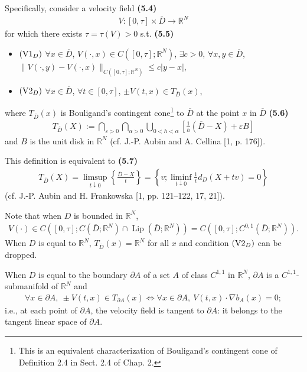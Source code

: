 \documentclass{book}
\numberwithin{equation}{section}
\begin{document}
\begin{enumerate}
    Specifically, consider a velocity field \textbf{(5.4)}
    \begin{align*}
        V:[0,\tau]\times\overline{D}\to\mathbb{R}^N
    \end{align*}
    for which there exists $\tau = \tau(V) > 0$ s.t. \textbf{(5.5)}
    \begin{itemize}
        \item $({\rm V1}_D)$ $\forall x\in\overline{D}$, $V(\cdot,x)\in C([0,\tau];\mathbb{R}^N)$, $\exists c > 0$, $\forall x,y\in\overline{D}$, $\|V(\cdot,y) - V(\cdot,x)\|_{C([0,\tau];\mathbb{R}^N)}\le c|y - x|$,
        \item $({\rm V2}_D)$ $\forall x\in\overline{D}$, $\forall t\in[0,\tau]$, $\pm V(t,x)\in T_{\overline{D}}(x)$,
    \end{itemize}
    where $T_{\overline{D}}(x)$ is Bouligand's contingent cone\footnote{This is an equivalent characterization of Bouligand's contingent cone of Definition 2.4 in Sect. 2.4 of Chap. 2.} to $\overline{D}$ at the point $x$ in $\overline{D}$ \textbf{(5.6)}
    \begin{align*}
        T_{\overline{D}}(X) := \bigcap_{\varepsilon > 0} \bigcap_{\alpha > 0} \bigcup_{0 < h < \alpha} \left[\frac{1}{h}(\overline{D} - X) + \varepsilon B\right]
    \end{align*}
    and $B$ is the unit disk in $\mathbb{R}^N$ (cf. J.-P. Aubin and A. Cellina [1, p. 176]).
    
    This definition is equivalent to \textbf{(5.7)}
    \begin{align*}
        T_{\overline{D}}(X) = \limsup_{t\downarrow 0} \left\{\frac{\overline{D} - X}{t}\right\} = \left\{v;\liminf_{t\downarrow 0} \frac{1}{t}d_D(X + tv) = 0\right\}
    \end{align*}
    (cf. J.-P. Aubin and H. Frankowska [1, pp. 121–122, 17, 21]).
    
    Note that when $D$ is bounded in $\mathbb{R}^N$,
    \begin{align*}
        V(\cdot)\in C([0,\tau];C(\overline{D};\mathbb{R}^N)\cap\operatorname{Lip}(\overline{D};\mathbb{R}^N)) = C([0,\tau];C^{0,1}(\overline{D};\mathbb{R}^N)).
    \end{align*}
    When $D$ is equal to $\mathbb{R}^N$, $T_{\overline{D}}(x) = \mathbb{R}^N$ for all $x$ and condition $({\rm V2}_D)$ can be dropped.
    
    When $D$ is equal to the boundary $\partial A$ of a set $A$ of class $C^{1,1}$ in $\mathbb{R}^N$, $\partial A$ is a $C^{1,1}$-submanifold of $\mathbb{R}^N$ and
    \begin{align*}
        \forall x\in\partial A,\ \pm V(t,x)\in T_{\partial A}(x)\Leftrightarrow\forall x\in\partial 
        A,\ V(t,x)\cdot\nabla b_A(x) = 0;
    \end{align*}
    i.e., at each point of $\partial A$, the velocity field is tangent to $\partial A$: it belongs to the tangent linear space of $\partial A$.
    

\end{enumerate}
\end{document}
